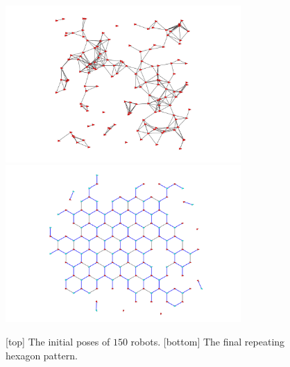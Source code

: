 \begin{figure}
    \centering
  \includegraphics[trim=5cm 0cm 5cm 0cm, clip=true, width=0.8\textwidth]{figs/hex150_init.png}
  \bigskip
  \includegraphics[trim=5cm 0cm 5cm 0cm, clip=true, width=0.8\textwidth]{figs/hex150_final.png}
  \caption{[top] The initial poses of $150$ robots. [bottom] The final repeating hexagon pattern.}
  \label{fig:hex-init-final}
\end{figure}


